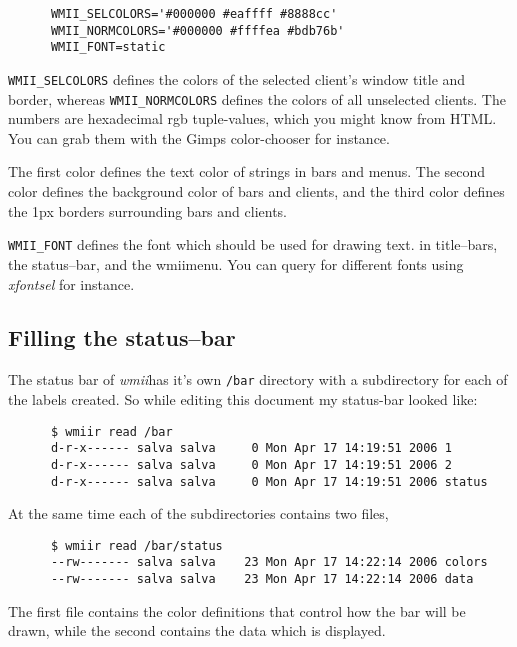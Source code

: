 \documentclass[12pt,a4paper]{article} %
\newcommand{\wmii}{\emph{wmii}}
\begin{document}
    \begin{verbatim}
      WMII_SELCOLORS='#000000 #eaffff #8888cc'
      WMII_NORMCOLORS='#000000 #ffffea #bdb76b'
      WMII_FONT=static
    \end{verbatim}

    \verb+WMII_SELCOLORS+ defines the colors of the selected client's window
    title and border, whereas \verb+WMII_NORMCOLORS+ defines the colors of all
    unselected clients. The numbers are hexadecimal rgb tuple-values, which you
    might know from HTML. You can grab them with the Gimps color-chooser for instance.

    The first color defines the text color of strings in bars and menus.
    The second color defines the background color of bars and clients, and
    the third color defines the 1px borders surrounding bars and clients.

    \verb+WMII_FONT+ defines the font which should be used for drawing text.
    in title--bars, the status--bar, and the wmiimenu.
    You can query for different fonts using \emph{xfontsel} for instance.

    \subsection{Filling the status--bar}
    \label{subsec:status}
    
    The status bar of \wmii has it's own \verb+/bar+ directory with
    a subdirectory for each of the labels created. So while editing
    this document my status-bar looked like:

    \begin{verbatim}
      $ wmiir read /bar
      d-r-x------ salva salva     0 Mon Apr 17 14:19:51 2006 1
      d-r-x------ salva salva     0 Mon Apr 17 14:19:51 2006 2
      d-r-x------ salva salva     0 Mon Apr 17 14:19:51 2006 status
    \end{verbatim}
    
    At the same time each of the subdirectories contains two files,

    \begin{verbatim}
      $ wmiir read /bar/status
      --rw------- salva salva    23 Mon Apr 17 14:22:14 2006 colors
      --rw------- salva salva    23 Mon Apr 17 14:22:14 2006 data
    \end{verbatim}


    The first file contains the color definitions that control how the
    bar will be drawn, while the second contains the data
    which is displayed.
    
\end{document}
